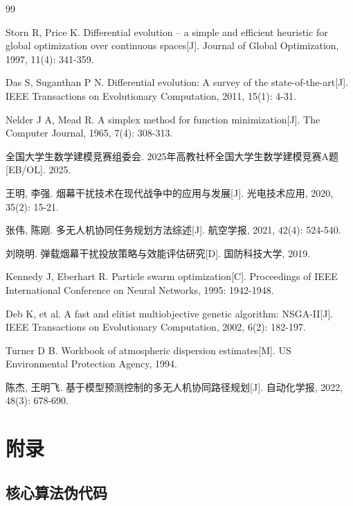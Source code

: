 \documentclass[12pt,a4paper]{ctexart}
\begin{document}
\begin{thebibliography}{99}

 Storn R, Price K. Differential evolution -- a simple and efficient heuristic for global optimization over continuous spaces[J]. Journal of Global Optimization, 1997, 11(4): 341-359.

 Das S, Suganthan P N. Differential evolution: A survey of the state-of-the-art[J]. IEEE Transactions on Evolutionary Computation, 2011, 15(1): 4-31.

 Nelder J A, Mead R. A simplex method for function minimization[J]. The Computer Journal, 1965, 7(4): 308-313.

 全国大学生数学建模竞赛组委会. 2025年高教社杯全国大学生数学建模竞赛A题[EB/OL]. 2025.

 王明, 李强. 烟幕干扰技术在现代战争中的应用与发展[J]. 光电技术应用, 2020, 35(2): 15-21.

 张伟, 陈刚. 多无人机协同任务规划方法综述[J]. 航空学报, 2021, 42(4): 524-540.

 刘晓明. 弹载烟幕干扰投放策略与效能评估研究[D]. 国防科技大学, 2019.

 Kennedy J, Eberhart R. Particle swarm optimization[C]. Proceedings of IEEE International Conference on Neural Networks, 1995: 1942-1948.

 Deb K, et al. A fast and elitist multiobjective genetic algorithm: NSGA-II[J]. IEEE Transactions on Evolutionary Computation, 2002, 6(2): 182-197.

 Turner D B. Workbook of atmospheric dispersion estimates[M]. US Environmental Protection Agency, 1994.

 陈杰, 王明飞. 基于模型预测控制的多无人机协同路径规划[J]. 自动化学报, 2022, 48(3): 678-690.

\end{thebibliography}

\newpage
\section*{附录}
\appendix

\subsection{核心算法伪代码}
\end{document}
